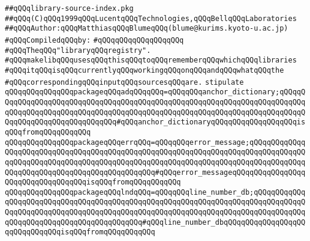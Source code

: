 \label{src/app/makelib/stuff/library-source-index.pkg}
\verb|##qQQqlibrary-source-index.pkg|\newline
\verb|##qQQq(C)qQQq1999qQQqLucentqQQqTechnologies,qQQqBellqQQqLaboratories|\newline
\verb|##qQQqAuthor:qQQqMatthiasqQQqBlumeqQQq(blume@kurims.kyoto-u.ac.jp)|\newline
\newline
\verb|#qQQqCompiledqQQqby:|\newline
\verb|#qQQqqQQqqQQqqQQqqQQq|\newline
\newline
\newline
\newline
\verb|#qQQqTheqQQq"libraryqQQqregistry".|\newline
\verb|#qQQqmakelibqQQqusesqQQqthisqQQqtoqQQqrememberqQQqwhichqQQqlibraries|\newline
\verb|#qQQqitqQQqisqQQqcurrentlyqQQqworkingqQQqonqQQqandqQQqwhatqQQqthe|\newline
\verb|#qQQqcorrespondingqQQqinputqQQqsourcesqQQqare.|\newline
\newline
\newline
\verb|stipulate|\newline
\verb|qQQqqQQqqQQqqQQqpackageqQQqadqQQqqQQq=qQQqqQQqanchor_dictionary;qQQqqQQqqQQqqQQqqQQqqQQqqQQqqQQqqQQqqQQqqQQqqQQqqQQqqQQqqQQqqQQqqQQqqQQqqQQqqQQqqQQqqQQqqQQqqQQqqQQqqQQqqQQqqQQqqQQqqQQqqQQqqQQqqQQqqQQqqQQqqQQqqQQqqQQqqQQqqQQqqQQqqQQqqQQq#qQQqanchor_dictionaryqQQqqQQqqQQqqQQqqQQqisqQQqfromqQQqqQQqqQQq|\newline
\verb|qQQqqQQqqQQqqQQqpackageqQQqerrqQQq=qQQqqQQqerror_message;qQQqqQQqqQQqqQQqqQQqqQQqqQQqqQQqqQQqqQQqqQQqqQQqqQQqqQQqqQQqqQQqqQQqqQQqqQQqqQQqqQQqqQQqqQQqqQQqqQQqqQQqqQQqqQQqqQQqqQQqqQQqqQQqqQQqqQQqqQQqqQQqqQQqqQQqqQQqqQQqqQQqqQQqqQQqqQQqqQQqqQQqqQQq#qQQqerror_messageqQQqqQQqqQQqqQQqqQQqqQQqqQQqqQQqqQQqisqQQqfromqQQqqQQqqQQq|\newline
\verb|qQQqqQQqqQQqqQQqpackageqQQqlndqQQq=qQQqqQQqline_number_db;qQQqqQQqqQQqqQQqqQQqqQQqqQQqqQQqqQQqqQQqqQQqqQQqqQQqqQQqqQQqqQQqqQQqqQQqqQQqqQQqqQQqqQQqqQQqqQQqqQQqqQQqqQQqqQQqqQQqqQQqqQQqqQQqqQQqqQQqqQQqqQQqqQQqqQQqqQQqqQQqqQQqqQQqqQQqqQQqqQQqqQQq#qQQqline_number_dbqQQqqQQqqQQqqQQqqQQqqQQqqQQqqQQqisqQQqfromqQQqqQQqqQQq|\newline
